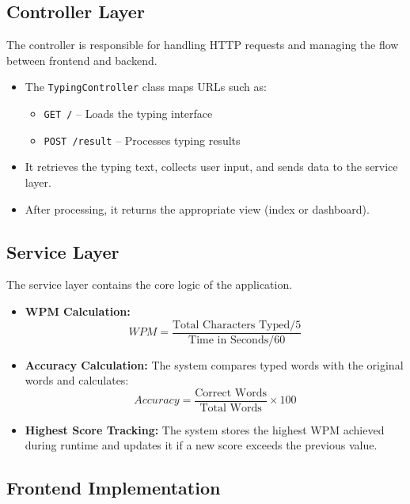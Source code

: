 \documentclass[a4paper,12pt]{article}
\begin{document}
\subsection{Controller Layer}

The controller is responsible for handling HTTP requests and managing the flow between frontend and backend.

\begin{itemize}
    \item The \texttt{TypingController} class maps URLs such as:
    \begin{itemize}
        \item \texttt{GET /} – Loads the typing interface
        \item \texttt{POST /result} – Processes typing results
    \end{itemize}
    
    \item It retrieves the typing text, collects user input, and sends data to the service layer.
    
    \item After processing, it returns the appropriate view (index or dashboard).
\end{itemize}

\subsection{Service Layer}

The service layer contains the core logic of the application.

\begin{itemize}

    \item \textbf{WPM Calculation:}
    \[
    WPM = \frac{\text{Total Characters Typed} / 5}{\text{Time in Seconds} / 60}
    \]

    \item \textbf{Accuracy Calculation:}
    The system compares typed words with the original words and calculates:
    \[
    Accuracy = \frac{\text{Correct Words}}{\text{Total Words}} \times 100
    \]

    \item \textbf{Highest Score Tracking:}
    The system stores the highest WPM achieved during runtime and updates it if a new score exceeds the previous value.

\end{itemize}

\subsection{Frontend Implementation}
\end{document}
